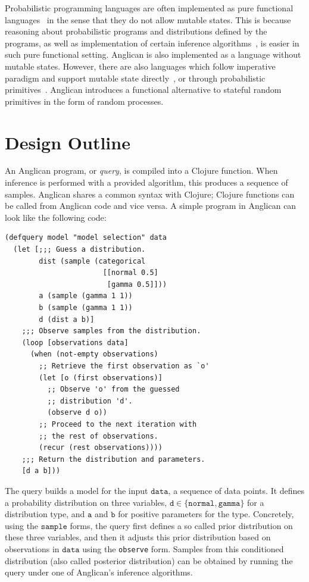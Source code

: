 \documentclass[sigconf]{acmart}
\begin{document}
Probabilistic programming languages are often implemented as
pure functional languages~\cite{GMR+08,MSP14,SGG15} in
the sense that they do not allow mutable states. This is
because reasoning about probabilistic programs and distributions
defined by the programs, as well as implementation of certain
inference algorithms~\cite{MYM+15}, is easier in such pure functional
setting. Anglican is also implemented as a language without
mutable states.  However, there are also languages which follow
imperative paradigm and support mutable state
directly~\cite{SDT14,GSX+16}, or through probabilistic
primitives~\cite{GMR+08,MSP14}. Anglican introduces a functional
alternative to stateful random primitives in the form of random
processes.

\section{Design Outline}
\label{sec:design}

An Anglican program, or \textit{query}, is compiled into a
Clojure function. When inference is performed with a provided
algorithm, this produces a sequence of samples. Anglican shares
a common syntax with Clojure; Clojure functions can be called
from Anglican code and vice versa. A simple program in Anglican
can look like the following code:
\begin{lstlisting}[style=default]
(defquery model "model selection" data
  (let [;;; Guess a distribution.
        dist (sample (categorical
                       [[normal 0.5]
                        [gamma 0.5]]))
        a (sample (gamma 1 1))
        b (sample (gamma 1 1))
        d (dist a b)]
    ;;; Observe samples from the distribution.
    (loop [observations data]
      (when (not-empty observations)
        ;; Retrieve the first observation as `o'
        (let [o (first observations)]
          ;; Observe 'o' from the guessed 
          ;; distribution 'd'.
          (observe d o))
        ;; Proceed to the next iteration with
        ;; the rest of observations.
        (recur (rest observations))))
    ;;; Return the distribution and parameters.
    [d a b]))
\end{lstlisting}

The query builds a model for the input $\texttt{data}$, 
a sequence of data points.
It defines a probability distribution on three variables, 
$\texttt{d} \in \{\texttt{normal},\texttt{gamma}\}$
for a distribution type, and $\texttt{a}$ and $\texttt{b}$ for
positive parameters for the type. Concretely,
using the $\texttt{sample}$ forms, the query
first defines a so called prior distribution on these three variables,
and then it adjusts this prior distribution based on observations in
$\texttt{data}$ using the \texttt{observe} form.
Samples from this conditioned distribution (also called posterior distribution)
can be obtained by running the query under one of Anglican's
inference algorithms.
\end{document}
